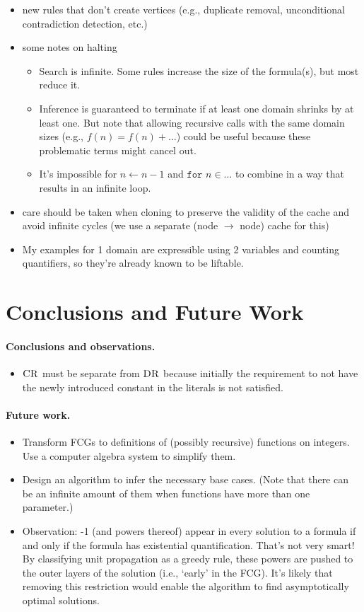 \begin{itemize}
\item new rules that don't create vertices (e.g., duplicate removal, unconditional contradiction detection, etc.)
\item some notes on halting
  \begin{itemize}
  \item Search is infinite. Some rules increase the size of the formula(s), but most reduce it.
  \item Inference is guaranteed to terminate if at least one domain shrinks by at least one. But note that allowing recursive calls with the same domain sizes (e.g., $f(n) = f(n) + \dots$) could be useful because these problematic terms might cancel out.
  \item It's impossible for $n \gets n - 1$ and $\texttt{for } n \in \dots$ to combine in a way that results in an infinite loop.
  \end{itemize}
\item care should be taken when cloning to preserve the validity of the cache and avoid infinite cycles (we use a separate (node $\to$ node) cache for this)
\item My examples for 1 domain are expressible using 2 variables and counting quantifiers, so they're already known to be liftable.
\end{itemize}

\section{Conclusions and Future Work}

\paragraph{Conclusions and observations.}
\begin{itemize}
\item $\operatorname{\textsc{CR}}$ must be separate from $\operatorname{\textsc{DR}}$ because initially the requirement to not have the newly introduced constant in the literals is not satisfied.
\end{itemize}

\paragraph{Future work.}
\begin{itemize}
\item Transform FCGs to definitions of (possibly recursive) functions on integers. Use a computer algebra system to simplify them.
\item Design an algorithm to infer the necessary base cases. (Note that there can be an infinite amount of them when functions have more than one parameter.)
\item Observation: -1 (and powers thereof) appear in every solution to a formula if and only if the formula has existential quantification. That's not very smart! By classifying unit propagation as a greedy rule, these powers are pushed to the outer layers of the solution (i.e., `early' in the FCG). It's likely that removing this restriction would enable the algorithm to find asymptotically optimal solutions.
\end{itemize}
